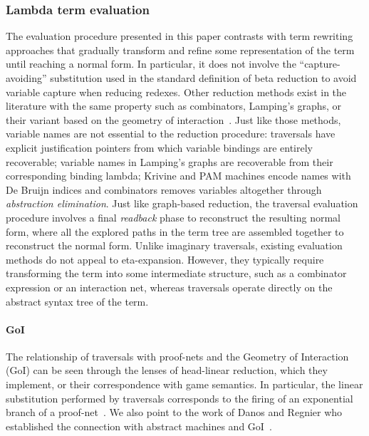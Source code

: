 \documentclass[xchauthor,chkrefs,GCNS,amsmath,amsthm,rotating,leaveRGB]{tcsg}
\theoremstyle{plain}
\theoremstyle{definition}
\begin{document}
\subsubsection{Lambda term evaluation}\label{sec1.3.4}

The evaluation procedure presented in this paper contrasts with term
rewriting approaches that gradually transform and refine some representation
of the term until reaching a normal form. In particular, it does not involve
the ``capture-avoiding'' substitution used in the standard definition of beta
reduction to avoid variable capture when reducing redexes. Other reduction
methods exist in the literature with the same property such as combinators,
Lamping's graphs, or their variant based on the geometry of
interaction~\cite{Lamping:1989:AOL:96709.96711,Gonthier:1992:GOL:143165.143172,curry_combinatorylogic,Barendregt84,b24}.
Just like those methods, variable names are not essential to the reduction
procedure: traversals have explicit justification pointers from which
variable bindings are entirely recoverable; variable names in Lamping's
graphs are recoverable from their corresponding binding lambda; Krivine and
PAM machines encode names with De Bruijn indices and combinators removes
variables altogether through \emph{abstraction elimination}. Just like
graph-based reduction, the traversal evaluation procedure involves a final
\emph{readback} phase to reconstruct the resulting normal form, where all the
explored paths in the term tree are assembled together to reconstruct the
normal form. Unlike imaginary traversals, existing evaluation methods do not
appeal to eta-expansion. However, they typically require
transforming the term into some intermediate structure, such as a combinator
expression or an interaction net, whereas traversals operate directly on the
abstract syntax tree of the term.

\paragraph*{GoI}
The relationship of traversals with proof-nets and the Geometry of
Interaction (GoI) can be seen through the lenses of head-linear reduction,
which they implement, or their correspondence with game semantics. In
particular, the linear substitution performed by traversals corresponds to
the firing of an exponential branch of a proof-net~\cite{MASCARI1994111}. We
also point to the work of Danos and Regnier who established the connection
with abstract machines and GoI~\cite{danosherbelinregnier1996}.
\end{document}
